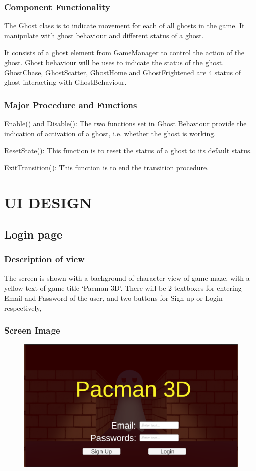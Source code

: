 \documentclass[11pt]{article}
\begin{document}
\subsubsection{Component Functionality}
The Ghost class is to indicate movement for each of all ghosts in the game. It manipulate with ghost behaviour and different status of a ghost.

It consists of a ghost element from GameManager to control the action of the ghost. Ghost behaviour will be uses to indicate the status of the ghost. GhostChase, GhostScatter, GhostHome and GhostFrightened are 4 status of ghost interacting with GhostBehaviour.
\subsubsection{Major Procedure and Functions}
Enable() and Disable(): The two functions set in Ghost Behaviour provide the indication of activation of a ghost, i.e. whether the ghost is working.

ResetState(): This function is to reset the status of a ghost to its default status.

ExitTransition(): This function is to end the transition procedure.

\section{UI DESIGN}

\subsection{Login page}
\subsubsection{Description of view}
The screen is shown with a background of character view of game maze, with a yellow text of game title `Pacman 3D'. There will be 2 textboxes for entering Email and Password of the user, and two buttons for Sign up or Login respectively,
\subsubsection{Screen Image}
\begin{figure}[H]
    \centering
    \includegraphics*[scale=0.2]{UI0.0Login.png}
\end{figure}
\end{document}
